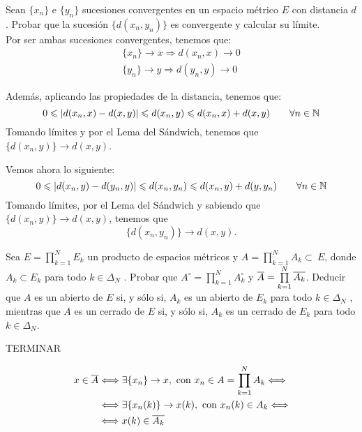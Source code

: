 \begin{ejercicio}
    Sean $\{x_n\}$ e $\{y_n\}$ sucesiones convergentes en un espacio métrico $E$ con distancia $d$. Probar que la sucesión $\{d(x_n, y_n)\}$ es convergente y calcular su límite.\\
    
    Por ser ambas sucesiones convergentes, tenemos que:
    \begin{gather*}
        \{x_n\} \to x \Longrightarrow d(x_n, x)\to 0 \\
        \{y_n\} \to y \Longrightarrow d(y_n, y)\to 0
    \end{gather*}

    Además, aplicando las propiedades de la distancia, tenemos que:
    \begin{equation*}
        0\leqslant |d(x_n,x)-d(x,y)|\leqslant d(x_n,y)\leqslant d(x_n,x) + d(x,y) \qquad \forall n\in \mathbb{N}
    \end{equation*}
    Tomando límites y por el Lema del Sándwich, tenemos que $\{d(x_n,y)\}\to d(x,y)$.

    Vemos ahora lo siguiente:
    \begin{equation*}
        0\leqslant |d(x_n,y)-d(y_n,y)|\leqslant d(x_n,y_n)\leqslant d(x_n,y) + d(y,y_n) \qquad \forall n\in \mathbb{N}
    \end{equation*}
    Tomando límites, por el Lema del Sándwich y sabiendo que $\{d(x_n,y)\}\to d(x,y)$, tenemos que $$\{d(x_n,y_n)\}\to d(x,y).$$
\end{ejercicio}


\begin{ejercicio}
    Sea $E = \prod\limits_{k=1}^N E_k$ un producto de espacios métricos y $A =\prod\limits_{k=1}^N A_k\subset~E$, donde $A_k \subset E_k$ para todo $k \in \Delta_N$ . Probar que $A^\circ =\prod\limits_{k=1}^N A_k^\circ$ y $\overline{A} =\prod\limits_{k=1}^N \overline{A_k}$. Deducir que $A$ es un abierto de $E$ si, y sólo si, $A_k$ es un abierto de $E_k$ para todo $k \in \Delta_N$ , mientras que $A$ es un cerrado de $E$ si, y sólo si, $A_k$ es un cerrado de $E_k$ para todo $k \in \Delta_N$.

    TERMINAR


    \begin{equation*}\begin{split}
        x\in \overline{A} &\Longleftrightarrow \exists \{x_n\}\to x, \text{ con }x_n\in A=\prod\limits_{k=1}^N A_k \Longleftrightarrow \\
        & \Longleftrightarrow  \exists \{x_n(k)\}\to x(k), \text{ con }x_n(k)\in A_k\Longleftrightarrow \\
        & \Longleftrightarrow x(k)\in \overline{A_k}
    \end{split}\end{equation*}
\end{ejercicio}
